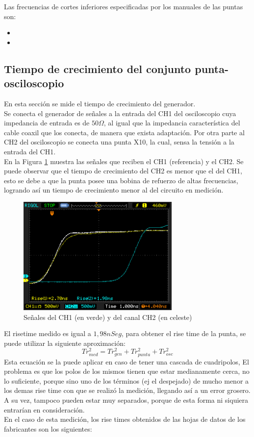\documentclass[a4paper,10pt]{article}
\begin{document}
		\indent Las frecuencias de cortes inferiores especificadas por los 
		manuales de las puntas son:

		\begin{itemize}
			\item
			\item
		\end{itemize}

		\subsection{Tiempo de crecimiento del conjunto punta-osciloscopio}
		
		\indent En esta secci\'on se mide el tiempo de crecimiento del 
		generador. \\
 		\indent Se conecta el generador de se\~nales a la entrada del CH1 del
		osciloscopio cuya impedancia de entrada es de $50 \Omega$, al igual 
		que la impedancia caracter\'istica del cable coaxil que los conecta, 
		de manera que exista adaptaci\'on. Por otra parte al CH2 del 
		osciloscopio se conecta una punta X10, la cual, sensa la tensi\'on a 
		la entrada del CH1. \\
		\indent En la Figura \ref{img008} muestra las se\~nales que
		reciben el CH1 (referencia) y el CH2. Se puede observar que el tiempo
		de crecimiento del CH2 es menor que el del CH1, esto se debe a que la
		punta posee una bobina de refuerzo de altas frecuencias, logrando así
		un tiempo de crecimiento menor al del circuito en medición.
		
		\begin{figure}[!htb]
			\centering
			\includegraphics[width=8cm]
			{Imagenes/Mediciones instrumentos/NewFile10.png}
			\caption{Se\~nales del CH1 (en verde) y del canal CH2 (en celeste)
			} \label{img008}
		\end{figure}
		\indent El risetime medido es igual a $1,98 nSeg$, para obtener el 
		rise time de la punta, se puede utilizar la siguiente aproximación:
		$$Tr_{med}^2 = Tr_{gen}^2 + Tr_{punta}^2 + Tr_{osc}^2$$
		\indent Esta ecuación se la puede aplicar en caso de tener una cascada
		de cuadripolos, El problema es que los polos de los mismos tienen que 
		estar medianamente cerca, no lo suficiente, porque sino uno de los 
		términos (ej el despejado) de mucho menor a los demas rise time con 
		que se realizó la medición, llegando así a un error grosero. A su vez,
		tampoco pueden estar muy separados, porque de esta forma ni siquiera 
		entrarían en consideración. \\
		\indent En el caso de esta medición, los rise times obtenidos de las 
		hojas de datos de los fabricantes son los siguientes: 
		
\end{document}
